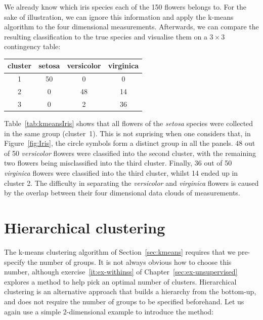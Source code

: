 We already know which iris species each of the 150 flowers belongs
to. For the sake of illustration, we can ignore this information and
apply the k-means algorithm to the four dimensional measurements.
Afterwards, we can compare the resulting classification to the true
species and visualise them on a $3\times{3}$ contingency table:

\begin{center}
  \begin{tabular}{c|ccc}
    cluster & setosa & versicolor & virginica \\ \hline
    1 & 50 & 0 & 0 \\
    2 & 0 & 48 & 14 \\
    3 & 0 & 2 & 36 
  \end{tabular}
  \label{tab:kmeansIris}
\end{center}

Table~\ref{tab:kmeansIris} shows that all flowers of the \emph{setosa}
species were collected in the same group (cluster~1). This is not
suprising when one considers that, in Figure~\ref{fig:Iris}, the
circle symbols form a distinct group in all the panels. 48 out of 50
\emph{versicolor} flowers were classified into the second cluster,
with the remaining two flowers being misclassified into the third
cluster. Finally, 36 out of 50 \emph{virginica} flowers were
classified into the third cluster, whilst 14 ended up in cluster 2.
The difficulty in separating the \emph{versicolor} and
\emph{virginica} flowers is caused by the overlap between their four
dimensional data clouds of measurements.

\section{Hierarchical clustering}
\label{sec:hierarchical}

The k-means clustering algorithm of Section~\ref{sec:kmeans} requires
that we pre-specify the number of groups.  It is not always obvious
how to choose this number, although exercise~\ref{it:ex-withinss} of
Chapter~\ref{sec:ex-unsupervised} explores a method to help pick an
optimal number of clusters.  Hierarchical clustering is an alternative
approach that builds a hierarchy from the bottom-up, and does not
require the number of groups to be specified beforehand. Let us again
use a simple 2-dimensional example to introduce the method:

